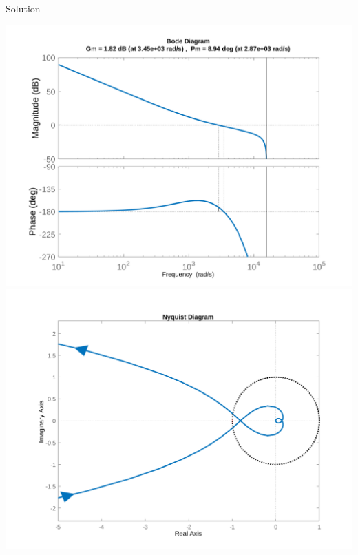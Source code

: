 \documentclass[presentation,aspectratio=169]{beamer}
\begin{document}
\begin{frame}[label={sec:orgee2b56b}]{Solution}
\begin{center}
 \includegraphics[height=0.55\textheight]{../../matlab/harddisk_margin_aa_crop}
 \includegraphics[height=0.55\textheight]{../../matlab/harddisk_nyquist_aa_crop}
\end{center}
\end{frame}
\end{document}

